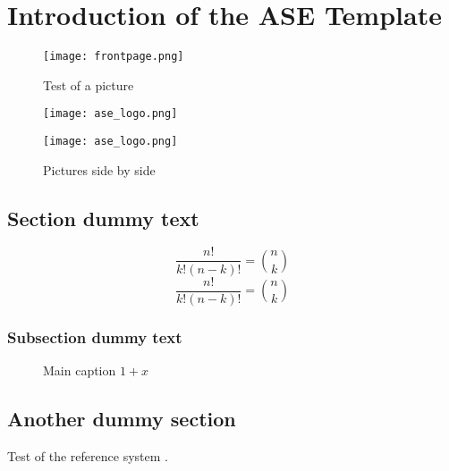\chapter{Introduction of the ASE Template}
\label{chap:f}
\setcounter{page}{1}
\lipsum[1]

\begin{figure}[htp]
  \centering
  \texttt{[image: frontpage.png]}
  \caption{Test of a picture}
  \label{fig:test}
\end{figure}

\lipsum[1]
\begin{figure}[ht]
  \begin{minipage}[htp]{0.48\linewidth}
    \centering
    \texttt{[image: ase\_logo.png]}
  \end{minipage}
  \hfill
  \begin{minipage}[htp]{0.48\linewidth}
    \centering
      \texttt{[image: ase\_logo.png]}
  \end{minipage}
    \caption{Pictures side by side}
  \label{fig:test1}
\end{figure}

\lipsum[1]

\section{Section dummy text}

\lipsum[1]

\[
 \frac{n!}{k!(n-k)!} = \binom{n}{k}
\]
\begin{equation}
  \frac{n!}{k!(n-k)!} = \binom{n}{k}
\end{equation}
\lipsum[1]

\subsection{Subsection dummy text}

\lipsum[1]

\begin{figure}
     \hfill
    \caption{Main caption $1+x$} 
\end{figure}

\lipsum[1]
\section{Another dummy section}

\lipsum

Test of the reference system \cite{Rabiner89}.